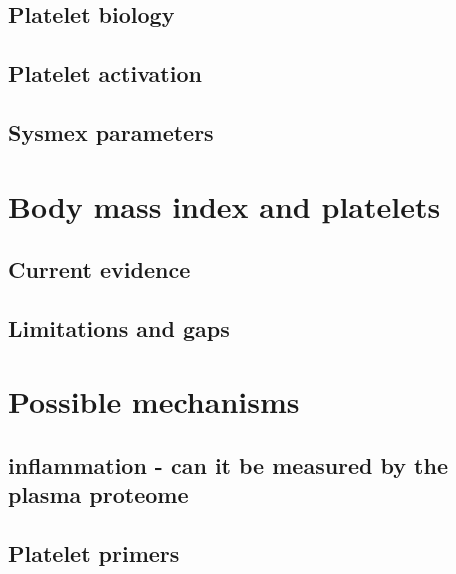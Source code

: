 \documentclass[11pt,twoside]{bristolthesis}
\begin{document}
\hypertarget{platelet-biology}{%
\subsection{Platelet biology}\label{platelet-biology}}

\hypertarget{platelet-activation}{%
\subsection{Platelet activation}\label{platelet-activation}}

\hypertarget{sysmex-parameters}{%
\subsection{Sysmex parameters}\label{sysmex-parameters}}

\hypertarget{body-mass-index-and-platelets}{%
\section{Body mass index and platelets}\label{body-mass-index-and-platelets}}

\hypertarget{current-evidence}{%
\subsection{Current evidence}\label{current-evidence}}

\hypertarget{limitations-and-gaps}{%
\subsection{Limitations and gaps}\label{limitations-and-gaps}}

\hypertarget{possible-mechanisms}{%
\section{Possible mechanisms}\label{possible-mechanisms}}

\hypertarget{inflammation---can-it-be-measured-by-the-plasma-proteome}{%
\subsection{inflammation - can it be measured by the plasma proteome}\label{inflammation---can-it-be-measured-by-the-plasma-proteome}}

\hypertarget{platelet-primers}{%
\subsection{Platelet primers}\label{platelet-primers}}
\end{document}
